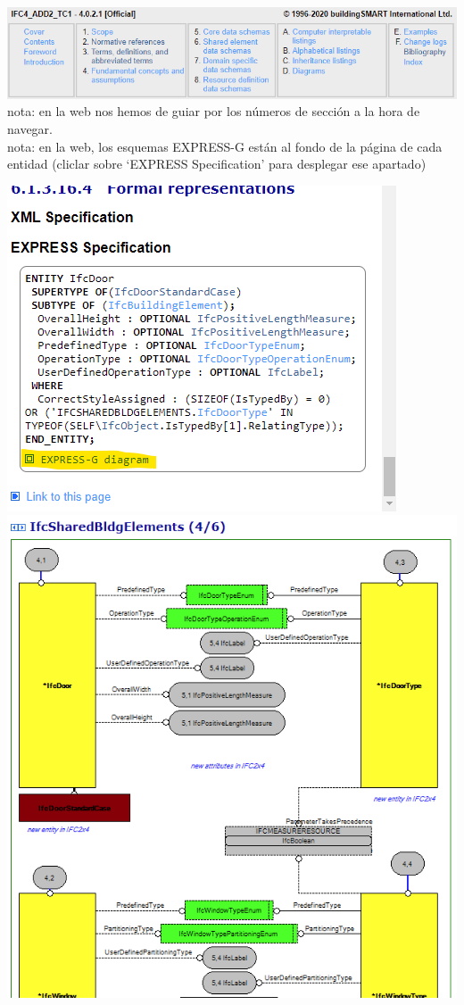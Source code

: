 \documentclass[spanish,10pt,a4paper,final,oneside]{article}
\begin{document}
\includegraphics[width=1.1\textwidth]{ifcDOC vs web - contenido web}
\\nota: en la web nos hemos de guiar por los números de sección a la hora de navegar.
\\nota: en la web, los esquemas EXPRESS-G están al fondo de la página de cada entidad (cliclar sobre `EXPRESS Specification' para desplegar ese apartado)
\begin{flushright}
\includegraphics[scale=0.4]{ifcDOC vs web - diagrama esta en el fondo}
\hspace{1cm}
\includegraphics[scale=0.3]{ifcDOC vs web - diagrama}

\end{flushright}
\end{document}
